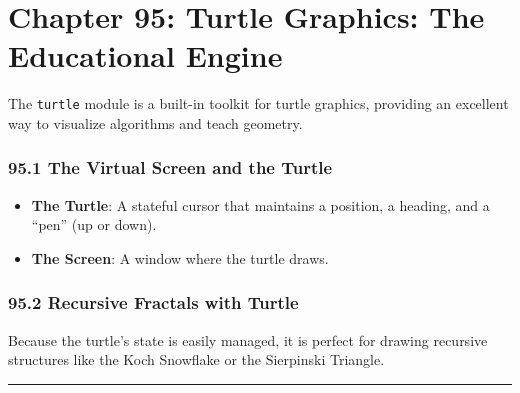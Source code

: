 \hypertarget{chapter-95-turtle-graphics-the-educational-engine}{%
\chapter{Chapter 95: Turtle Graphics: The Educational
Engine}\label{chapter-95-turtle-graphics-the-educational-engine}}

The \passthrough{\lstinline!turtle!} module is a built-in toolkit for
turtle graphics, providing an excellent way to visualize algorithms and
teach geometry.

\hypertarget{the-virtual-screen-and-the-turtle}{%
\subsection{95.1 The Virtual Screen and the
Turtle}\label{the-virtual-screen-and-the-turtle}}

\begin{itemize}
\tightlist
\item
  \textbf{The Turtle}: A stateful cursor that maintains a position, a
  heading, and a ``pen'' (up or down).
\item
  \textbf{The Screen}: A window where the turtle draws.
\end{itemize}

\hypertarget{recursive-fractals-with-turtle}{%
\subsection{95.2 Recursive Fractals with
Turtle}\label{recursive-fractals-with-turtle}}

Because the turtle's state is easily managed, it is perfect for drawing
recursive structures like the Koch Snowflake or the Sierpinski Triangle.

\begin{center}\rule{0.5\linewidth}{0.5pt}\end{center}

